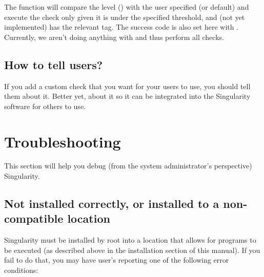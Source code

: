 \documentclass[letterpaper,10pt,english]{sphinxmanual}
\begin{document}
The function  will compare the level (\sphinxcode{\sphinxupquote{{[}LEVEL{]}}}) with the user specified (or
default)  and execute the check only given it is under the specified
threshold, and (not yet implemented) has the relevant tag. The success
code is also set here with \sphinxcode{\sphinxupquote{{[}SUCCESS{]}}}. Currently, we aren’t doing anything with \sphinxcode{\sphinxupquote{{[}TAGS{]}}}
and thus perform all checks.


\section{How to tell users?}
\label{\detokenize{container_checks:how-to-tell-users}}
If you add a custom check that you want for your users to use, you
should tell them about it. Better yet,  about it
so it can be integrated into the Singularity software for others to use.


\chapter{Troubleshooting}
\label{\detokenize{troubleshooting:troubleshooting}}\label{\detokenize{troubleshooting::doc}}
This section will help you debug (from the system administrator’s
perspective) Singularity.


\section{Not installed correctly, or installed to a non-compatible location}
\label{\detokenize{troubleshooting:not-installed-correctly-or-installed-to-a-non-compatible-location}}
Singularity must be installed by root into a location that allows for
 programs to be executed (as described above in the installation
section of this manual). If you fail to do that, you may have user’s
reporting one of the following error conditions:

%
\begin{sphinxVerbatim}[commandchars=\\\{\}]
            

     
\end{sphinxVerbatim}
\end{document}
